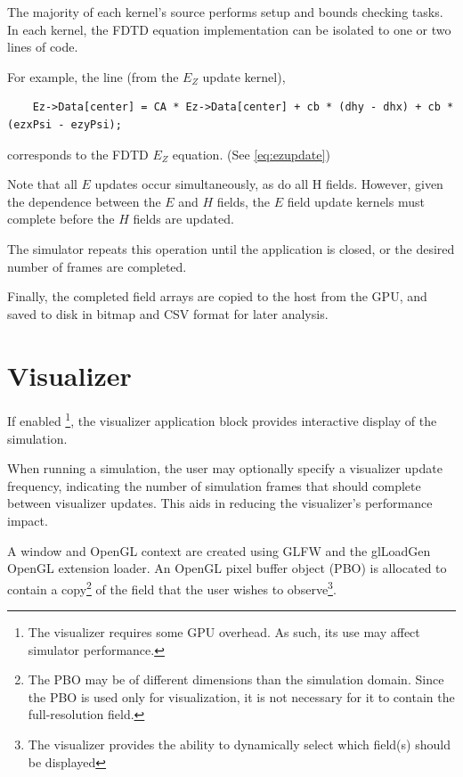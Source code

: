 The majority of each kernel's source performs setup and bounds checking tasks. In each kernel, the FDTD equation implementation can be isolated to one or two lines of code.

For example, the line (from the $E_Z$ update kernel),

\begin{lstlisting}
	Ez->Data[center] = CA * Ez->Data[center] + cb * (dhy - dhx) + cb * (ezxPsi - ezyPsi);
\end{lstlisting}

corresponds to the FDTD $E_Z$ equation. (See \autoref{eq:ezupdate})

\label{listing:updateHxCpp}

\label{listing:updateHyCpp}

Note that all $E$ updates occur simultaneously, as do all H fields. However, given the dependence between the $E$ and $H$ fields, the $E$ field update kernels must complete before the $H$ fields are updated.

The simulator repeats this operation until the application is closed, or the desired number of frames are completed. 

Finally, the completed field arrays are copied to the host from the GPU, and saved to disk in bitmap and CSV format for later analysis. 

\section{Visualizer}\label{sec:visualizer}

If enabled \footnote{The visualizer requires some GPU overhead. As such, its use may affect simulator performance. }, the visualizer application block provides interactive display of the simulation. 

When running a simulation, the user may optionally specify a visualizer update frequency, indicating the number of simulation frames that should complete between visualizer updates. This aids in reducing the visualizer's performance impact.

A window and OpenGL context are created using GLFW and the glLoadGen OpenGL extension loader. An OpenGL pixel buffer object (PBO) is allocated to contain a copy\footnote{The PBO may be of different dimensions than the simulation domain. Since the PBO is used only for visualization, it is not necessary for it to contain the full-resolution field.} of the field that the user wishes to observe\footnote{The visualizer provides the ability to dynamically select which field(s) should be displayed}. 

